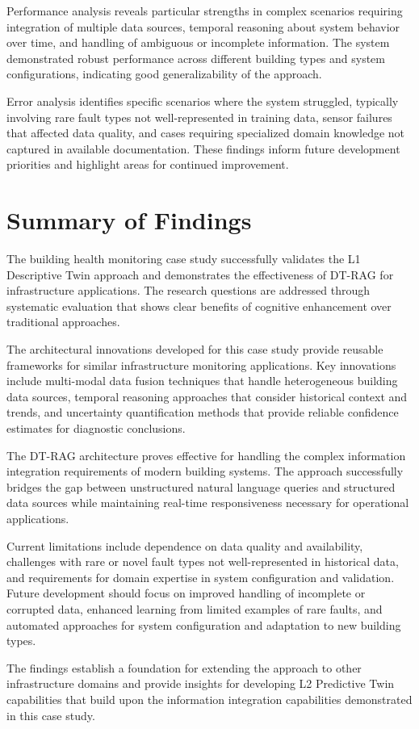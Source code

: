 Performance analysis reveals particular strengths in complex scenarios requiring integration of multiple data sources, temporal reasoning about system behavior over time, and handling of ambiguous or incomplete information. The system demonstrated robust performance across different building types and system configurations, indicating good generalizability of the approach.

Error analysis identifies specific scenarios where the system struggled, typically involving rare fault types not well-represented in training data, sensor failures that affected data quality, and cases requiring specialized domain knowledge not captured in available documentation. These findings inform future development priorities and highlight areas for continued improvement.

\section{Summary of Findings}

The building health monitoring case study successfully validates the L1 Descriptive Twin approach and demonstrates the effectiveness of DT-RAG for infrastructure applications. The research questions are addressed through systematic evaluation that shows clear benefits of cognitive enhancement over traditional approaches.

The architectural innovations developed for this case study provide reusable frameworks for similar infrastructure monitoring applications. Key innovations include multi-modal data fusion techniques that handle heterogeneous building data sources, temporal reasoning approaches that consider historical context and trends, and uncertainty quantification methods that provide reliable confidence estimates for diagnostic conclusions.

The DT-RAG architecture proves effective for handling the complex information integration requirements of modern building systems. The approach successfully bridges the gap between unstructured natural language queries and structured data sources while maintaining real-time responsiveness necessary for operational applications.

Current limitations include dependence on data quality and availability, challenges with rare or novel fault types not well-represented in historical data, and requirements for domain expertise in system configuration and validation. Future development should focus on improved handling of incomplete or corrupted data, enhanced learning from limited examples of rare faults, and automated approaches for system configuration and adaptation to new building types.

The findings establish a foundation for extending the approach to other infrastructure domains and provide insights for developing L2 Predictive Twin capabilities that build upon the information integration capabilities demonstrated in this case study.

